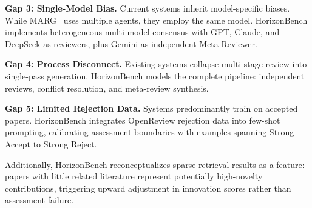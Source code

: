 \textbf{Gap 3: Single-Model Bias.} Current systems inherit model-specific biases. While MARG~\cite{darcy2024marg} uses multiple agents, they employ the same model. HorizonBench implements heterogeneous multi-model consensus with GPT, Claude, and DeepSeek as reviewers, plus Gemini as independent Meta Reviewer.

\textbf{Gap 4: Process Disconnect.} Existing systems collapse multi-stage review into single-pass generation. HorizonBench models the complete pipeline: independent reviews, conflict resolution, and meta-review synthesis.

\textbf{Gap 5: Limited Rejection Data.} Systems predominantly train on accepted papers. HorizonBench integrates OpenReview rejection data into few-shot prompting, calibrating assessment boundaries with examples spanning Strong Accept to Strong Reject.

Additionally, HorizonBench reconceptualizes sparse retrieval results as a feature: papers with little related literature represent potentially high-novelty contributions, triggering upward adjustment in innovation scores rather than assessment failure.
